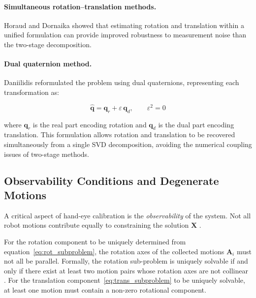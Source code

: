 \paragraph{Simultaneous rotation--translation methods.}
Horaud and Dornaika \cite{horaud1995hand} showed that estimating rotation and translation
within a unified formulation can provide
improved robustness to measurement noise than the two-stage
decomposition. 



\paragraph{Dual quaternion method.}
Daniilidis \cite{daniilidis1999hand} reformulated the problem using dual
quaternions, representing each transformation as:

\begin{equation}
    \hat{\mathbf{q}} = \mathbf{q}_r + \varepsilon\, \mathbf{q}_d,
    \qquad \varepsilon^2 = 0
    \label{eq:dual_quat}
\end{equation}

\noindent where $\mathbf{q}_r$ is the real part encoding rotation and
$\mathbf{q}_d$ is the dual part encoding translation. This formulation allows
rotation and translation to be recovered simultaneously from a single SVD
decomposition, avoiding the numerical coupling issues of two-stage methods.


\subsection{Observability Conditions and Degenerate Motions}
\label{subsec:observability}

A critical aspect of hand-eye calibration is the \textit{observability} of the
system. Not all robot motions contribute equally to constraining the solution
$\mathbf{X}$ \cite{strobl2006optimal, shiu1989calibration}.

For the rotation component to be uniquely determined from
equation~\eqref{eq:rot_subproblem}, the rotation axes of the collected motions
$\mathbf{A}_i$ must not all be parallel. Formally, the rotation sub-problem is
uniquely solvable if and only if there exist at least two motion pairs whose
rotation axes are not collinear \cite{park1994robot}. For the translation
component~\eqref{eq:trans_subproblem} to be uniquely solvable, at least one
motion must contain a non-zero rotational component.

